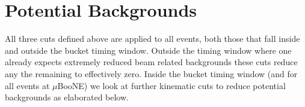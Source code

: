\documentclass[11pt, a4paper]{article}
\def\ster{\ensuremath N}
\begin{document}
\section{Potential Backgrounds\label{app:bg}}
%
%
%
All three cuts defined above are applied to all events, both those that fall
inside and outside the bucket timing window. Outside the timing window where
one already expects extremely reduced beam related backgrounds these cuts
reduce any the remaining to effectively zero. Inside the bucket timing window
(and for all events at $\mu$BooNE) we look at further kinematic cuts to reduce
potential backgrounds as elaborated below.
\end{document}
